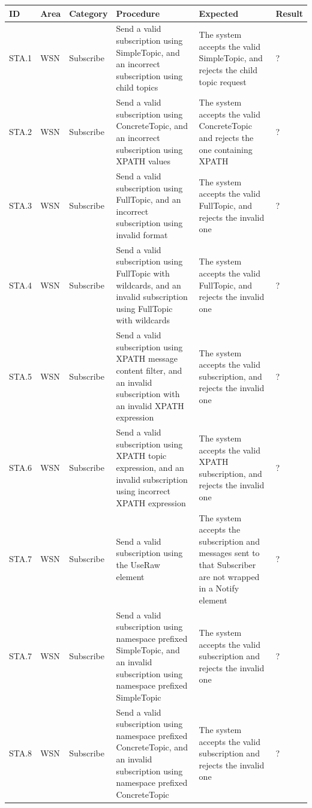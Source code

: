 \begin{table}[ht!]
\tiny
\begin{tabular}{|m{0.5cm}|m{1.2cm}|m{1.2cm}|m{3.3cm}|m{3.3cm}|m{1.5cm}|}
\hline
\rowcolor{lightgray}
\textbf{ID} & \textbf{Area} & \textbf{Category} & \textbf{Procedure} & \textbf{Expected} & \textbf{Result}\\ \hline
STA.1 & WSN & Subscribe & Send a valid subscription using SimpleTopic, and an incorrect subscription using child topics & The system accepts the valid SimpleTopic, and rejects the child topic request & ? \\ \hline
STA.2 & WSN & Subscribe & Send a valid subscription using ConcreteTopic, and an incorrect subscription using XPATH values & The system accepts the valid ConcreteTopic and rejects the one containing XPATH & ? \\ \hline
STA.3 & WSN & Subscribe & Send a valid subscription using FullTopic, and an incorrect subscription using invalid format & The system accepts the valid FullTopic, and rejects the invalid one & ? \\ \hline
STA.4 & WSN & Subscribe & Send a valid subscription using FullTopic with wildcards, and an invalid subscription using FullTopic with wildcards & The system accepts the valid FullTopic, and rejects the invalid one & ? \\ \hline
STA.5 & WSN & Subscribe & Send a valid subscription using XPATH message content filter, and an invalid subscription with an invalid XPATH expression & The system accepts the valid subscription, and rejects the invalid one & ? \\ \hline
STA.6 & WSN & Subscribe & Send a valid subscription using XPATH topic expression, and an invalid subscription using incorrect XPATH expression & The system accepts the valid XPATH subscription, and rejects the invalid one & ? \\ \hline
STA.7 & WSN & Subscribe & Send a valid subscription using the UseRaw element & The system accepts the subscription and messages sent to that Subscriber are not wrapped in a Notify element & ? \\ \hline
STA.7 & WSN & Subscribe & Send a valid subscription using namespace prefixed SimpleTopic, and an invalid subscription using namespace prefixed SimpleTopic & The system accepts the valid subscription and rejects the invalid one & ? \\ \hline
STA.8 & WSN & Subscribe & Send a valid subscription using namespace prefixed ConcreteTopic, and an invalid subscription using namespace prefixed ConcreteTopic & The system accepts the valid subscription and rejects the invalid one & ? \\ \hline

\end{tabular}
\end{table}
